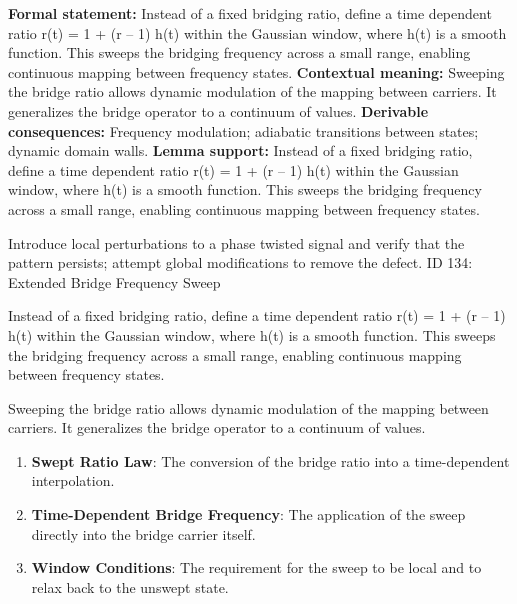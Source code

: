 \begingroup\footnotesize\setlength{\emergencystretch}{3em}\sloppy
\textbf{Formal statement:} Instead of a fixed bridging ratio, define a time dependent ratio r(t) = 1 + (r  -- 1) h(t) within the Gaussian window, where h(t) is a smooth function. This sweeps the bridging frequency across a small range, enabling continuous mapping between frequency states.
\textbf{Contextual meaning:} Sweeping the bridge ratio allows dynamic modulation of the mapping between carriers. It generalizes the bridge operator to a continuum of values.
\textbf{Derivable consequences:} Frequency modulation; adiabatic transitions between states; dynamic domain walls.
\textbf{Lemma support:} Instead of a fixed bridging ratio, define a time dependent ratio r(t) = 1 + (r  -- 1) h(t) within the Gaussian window, where h(t) is a smooth function. This sweeps the bridging frequency across a small range, enabling continuous mapping between frequency states.\par
\endgroup

Introduce local perturbations to a phase twisted signal and verify that the pattern persists; attempt global modifications to remove the defect. ID 134: Extended Bridge Frequency Sweep

Instead of a fixed bridging ratio, define a time dependent ratio r(t) = 1 + (r  -- 1) h(t) within the Gaussian window, where h(t) is a smooth function. This sweeps the bridging frequency across a small range, enabling continuous mapping between frequency states.

Sweeping the bridge ratio allows dynamic modulation of the mapping between carriers. It generalizes the bridge operator to a continuum of values.
\endgroup

\begin{enumerate}[leftmargin=1.6em,itemsep=6pt,topsep=4pt]
\item \textbf{Swept Ratio Law}: The conversion of the bridge ratio into a time-dependent interpolation.
\item \textbf{Time-Dependent Bridge Frequency}: The application of the sweep directly into the bridge carrier itself.
\item \textbf{Window Conditions}: The requirement for the sweep to be local and to relax back to the unswept state.
\end{enumerate}

